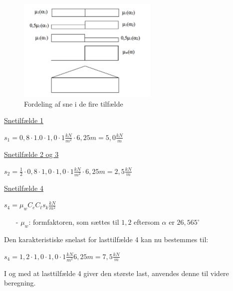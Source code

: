 \begin{figure}[htbp]
	\centering
	\includegraphics[width=0.6\textwidth]{billeder/snelasttilfaelde.png}
	\caption{Fordeling af sne i de fire tilfælde}
	\label{fig:sne}
\end{figure}

\underline{Snetilfælde 1}
\begin{center}
$s_1=0,\!8\cdot 1.0\cdot 1,\!0\cdot 1 \frac{kN}{m^2}\cdot 6,\!25 m=5,\!0 \frac{kN}{m}$
\end{center}
\underline{Snetilfælde 2 og 3}
\begin{center}
$s_2=\frac{1}{2}\cdot 0,\!8\cdot 1,\!0\cdot 1,\!0\cdot 1 \frac{kN}{m^2}\cdot 6,\!25 m=2,\!5 \frac{kN}{m}$
\end{center}
\underline{Snetilfælde 4}
\begin{center}
	$s_4=\mu_wC_eC_ts_k \frac{kN}{m^2}$
\end{center}
\begin{itemize}
	\item[-] $\mu_w$: formfaktoren, som sættes til $1,\!2$ eftersom $\alpha$ er $26,\!565^{\circ}$ \citep[ kapitel 5.3.3]{EU91}
\end{itemize}
Den karakteristiske snelast for lasttilfælde 4 kan nu bestemmes til:
\begin{center}
	$s_4=1,\!2\cdot 1,\!0\cdot 1,\!0\cdot 1 \frac{kN}{m^2}6,\!25 m=7,\!5 \frac{kN}{m}$
\end{center}
I og med at lasttilfælde 4 giver den største last, anvendes denne til videre beregning.

